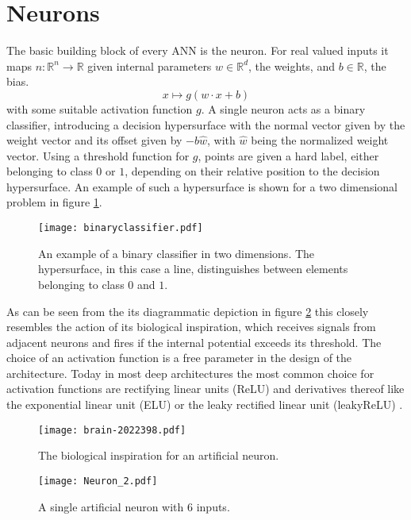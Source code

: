 \section{Neurons}
\label{sec:Neurons}
The basic building block of every ANN is the neuron. For real valued inputs it maps $n: \mathbb{R}^n \rightarrow \mathbb{R}$ given internal parameters $w \in \mathbb{R}^d$, the weights, and $b \in \mathbb{R}$, the bias.
\begin{equation}
x \mapsto g(w \cdot x + b)
\end{equation}
with some suitable activation function $g$. A single neuron acts as a binary classifier, introducing a decision hypersurface with the normal vector given by the weight vector and its offset given by $-b \hat{w}$, with $\hat{w}$ being the normalized weight vector. Using a threshold function for $g$, points are given a hard label, either belonging to class $0$ or $1$, depending on their relative position to the decision hypersurface. An example of such a hypersurface is shown for a two dimensional problem in figure \ref{fig:binaryclassifier}. \\

\begin{figure}[H]
\centering
  \texttt{[image: binaryclassifier.pdf]}
  \caption{An example of a binary classifier in two dimensions. The hypersurface, in this case a line, distinguishes between elements belonging to class $0$ and $1$.}
  \label{fig:binaryclassifier}
\end{figure}

As can be seen from the its diagrammatic depiction in figure \ref{fig:Neuron} this closely resembles the action of its biological inspiration, which receives signals from adjacent neurons and fires if the internal potential exceeds its threshold.
The choice of an activation function is a free parameter in the design of the architecture. Today in most deep architectures the most common choice for activation functions are rectifying linear units (ReLU) and derivatives thereof like the exponential linear unit (ELU) \cite{Clevert2015} or the leaky rectified linear unit (leakyReLU) \cite{Maas2013}.

\begin{figure}[H]
\centering
  \texttt{[image: brain-2022398.pdf]}
  \caption{The biological inspiration for an artificial neuron.}
  \label{fig:Neuron}
  \texttt{[image: Neuron\_2.pdf]}
  \caption{A single artificial neuron with $6$ inputs.}
  \label{fig:Neuron}
\end{figure}


